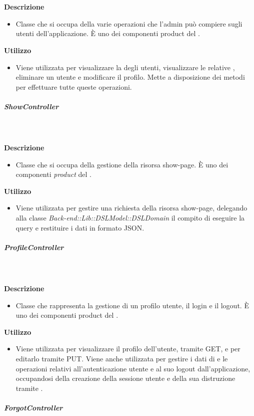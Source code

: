         \textbf{\\ \\ Descrizione} 
          \begin{itemize}
            \item[] Classe che si occupa della varie operazioni che l'admin può compiere sugli utenti dell'applicazione. È uno dei componenti product del  .
          \end{itemize}      
        \textbf{Utilizzo}  
          \begin{itemize}
            \item[] Viene utilizzata per visualizzare la  degli utenti, visualizzare le relative , eliminare un utente e modificare il profilo. Mette a disposizione dei metodi per effettuare tutte queste operazioni.
          \end{itemize}
      \subparagraph{ShowController}
        
        \textbf{\\ \\ Descrizione} 
          \begin{itemize}
            \item[] Classe che si occupa della gestione della risorsa show-page. È uno dei componenti \textit{product} del  .
          \end{itemize}      
        \textbf{Utilizzo}  
          \begin{itemize}
            \item[] Viene utilizzata per gestire una richiesta della risorsa show-page, delegando alla classe \textit{Back-end::Lib::DSLModel::DSLDomain} il compito di eseguire la query e restituire i dati in formato JSON.
          \end{itemize}
      \subparagraph{ProfileController}
        
        \textbf{\\ \\ Descrizione} 
          \begin{itemize}
            \item[] Classe che rappresenta la gestione di un profilo utente, il login e il logout. È uno dei componenti product del  .

          \end{itemize}      
        \textbf{Utilizzo}  
          \begin{itemize}
            \item[] Viene utilizzata per visualizzare il profilo dell'utente, tramite GET, e per editarlo tramite PUT. Viene anche utilizzata per gestire i dati di e le operazioni relativi all'autenticazione utente e al suo logout dall'applicazione, occupandosi della creazione della sessione utente e della sua distruzione tramite .
          \end{itemize}
      \subparagraph{ForgotController}
        
